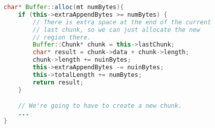 \begin{lstlisting}[language=Java]
char* Buffer::alloc(mt numBytes){
    if (this->extraAppendBytes >= numBytes) {
        // There is extra space at the end of the current 
        // last chunk, so we can just allocate the new 
        // region there.
        Buffer::Chunk* chunk = this->lastChunk; 
        char* result = chunk->data + chunk->length; 
        chunk->length += nuinBytes; 
        this->extraAppendBytes -= nuinBytes; 
        this->totalLength += numBytes; 
        return result;
    }

    // We're going to have to create a new chunk.
    ...
}
\end{lstlisting}